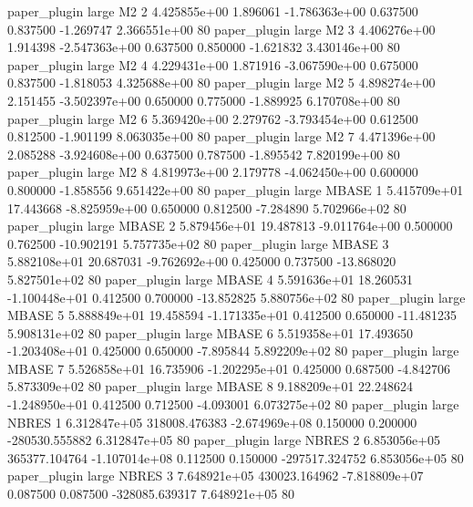       paper_plugin      large       M2                 2 4.425855e+00      1.896061 -1.786363e+00 0.637500 0.837500      -1.269747 2.366551e+00 80
       paper_plugin      large       M2                 3 4.406276e+00      1.914398 -2.547363e+00 0.637500 0.850000      -1.621832 3.430146e+00 80
       paper_plugin      large       M2                 4 4.229431e+00      1.871916 -3.067590e+00 0.675000 0.837500      -1.818053 4.325688e+00 80
       paper_plugin      large       M2                 5 4.898274e+00      2.151455 -3.502397e+00 0.650000 0.775000      -1.889925 6.170708e+00 80
       paper_plugin      large       M2                 6 5.369420e+00      2.279762 -3.793454e+00 0.612500 0.812500      -1.901199 8.063035e+00 80
       paper_plugin      large       M2                 7 4.471396e+00      2.085288 -3.924608e+00 0.637500 0.787500      -1.895542 7.820199e+00 80
       paper_plugin      large       M2                 8 4.819973e+00      2.179778 -4.062450e+00 0.600000 0.800000      -1.858556 9.651422e+00 80
       paper_plugin      large    MBASE                 1 5.415709e+01     17.443668 -8.825959e+00 0.650000 0.812500      -7.284890 5.702966e+02 80
       paper_plugin      large    MBASE                 2 5.879456e+01     19.487813 -9.011764e+00 0.500000 0.762500     -10.902191 5.757735e+02 80
       paper_plugin      large    MBASE                 3 5.882108e+01     20.687031 -9.762692e+00 0.425000 0.737500     -13.868020 5.827501e+02 80
       paper_plugin      large    MBASE                 4 5.591636e+01     18.260531 -1.100448e+01 0.412500 0.700000     -13.852825 5.880756e+02 80
       paper_plugin      large    MBASE                 5 5.888849e+01     19.458594 -1.171335e+01 0.412500 0.650000     -11.481235 5.908131e+02 80
       paper_plugin      large    MBASE                 6 5.519358e+01     17.493650 -1.203408e+01 0.425000 0.650000      -7.895844 5.892209e+02 80
       paper_plugin      large    MBASE                 7 5.526858e+01     16.735906 -1.202295e+01 0.425000 0.687500      -4.842706 5.873309e+02 80
       paper_plugin      large    MBASE                 8 9.188209e+01     22.248624 -1.248950e+01 0.412500 0.712500      -4.093001 6.073275e+02 80
       paper_plugin      large    NBRES                 1 6.312847e+05 318008.476383 -2.674969e+08 0.150000 0.200000 -280530.555882 6.312847e+05 80
       paper_plugin      large    NBRES                 2 6.853056e+05 365377.104764 -1.107014e+08 0.112500 0.150000 -297517.324752 6.853056e+05 80
       paper_plugin      large    NBRES                 3 7.648921e+05 430023.164962 -7.818809e+07 0.087500 0.087500 -328085.639317 7.648921e+05 80
